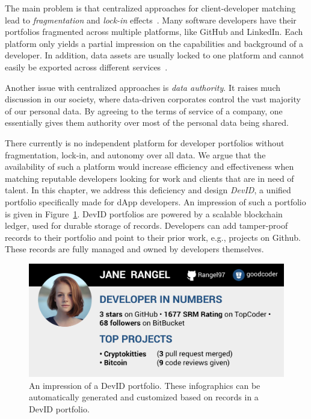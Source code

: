 The main problem is that centralized approaches for client-developer matching lead to \emph{fragmentation} and \emph{lock-in} effects~\cite{pouwelse2017laws}.
Many software developers have their portfolios fragmented across multiple platforms, like GitHub and LinkedIn.
Each platform only yields a partial impression on the capabilities and background of a developer.
In addition, data assets are usually locked to one platform and cannot easily be exported across different services~\cite{hesse2019reputation}.

Another issue with centralized approaches is \emph{data authority}.
It raises much discussion in our society, where data-driven corporates control the vast majority of our personal data.
By agreeing to the terms of service of a company, one essentially gives them authority over most of the personal data being shared.

There currently is no independent platform for developer portfolios without fragmentation, lock-in, and autonomy over all data.
We argue that the availability of such a platform would increase efficiency and effectiveness when matching reputable developers looking for work and clients that are in need of talent.
In this chapter, we address this deficiency and design \emph{DevID}, a unified portfolio specifically made for dApp developers.
An impression of such a portfolio is given in Figure~\ref{fig:devid}.
DevID portfolios are powered by a scalable blockchain ledger, used for durable storage of records.
Developers can add tamper-proof records to their portfolio and point to their prior work, e.g., projects on Github.
These records are fully managed and owned by developers themselves.

\begin{figure}[t]
	\includegraphics[width=\columnwidth]{devid/resources/devid_smaller.jpeg}
	\caption{An impression of a DevID portfolio. These infographics can be automatically generated and customized based on records in a DevID portfolio.}
	\label{fig:devid}
\end{figure}

